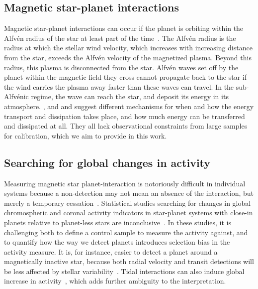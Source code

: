 \documentclass[twocolumn]{aastex631}
\begin{document}
\subsection{Magnetic star-planet interactions}
\label{sec:intro:mspi}
Magnetic star-planet interactions can occur if the planet is orbiting within the Alfv\'en radius of the star at least part of the time~\citep{preusse2006magnetic, cohen2011dynamics}. The Alfv\'en radius is the radius at which the stellar wind velocity, which increases with increasing distance from the star, exceeds the Alfv\'en velocity of the magnetized plasma. Beyond this radius, this plasma is disconnected from the star. Alfv\'en waves set off by the planet within the magnetic field they cross cannot propagate back to the star if the wind carries the plasma away faster than these waves can travel. In the sub-Alfv\'enic regime, the wave can reach the star, and deposit its energy in its atmosphere. \citet{lanza2012starplanet, lanza2018closeby}, and \citet{zarka2007plasma} and \citet{saur2013magnetic} suggest different mechanisms for when and how the energy transport and dissipation takes place, and how much energy can be transferred and dissipated at all. They all lack observational constraints from large samples for calibration, which we aim to provide in this work.

\subsection{Searching for global changes in activity}
\label{sec:intro:global}
Measuring magnetic star planet-interaction is notoriously difficult in individual systems because a non-detection may not mean an absence of the interaction, but merely a temporary cessation~\citep{shkolnik2005hot, shkolnik2008nature}. Statistical studies searching for changes in global chromospheric and coronal activity indicators in star-planet systems with close-in planets relative to planet-less stars are inconclusive~\citep{kashyap2008extrasolar,scharf2010possible, shkolnik2013ultraviolet, france2018farultraviolet, viswanath2020statistical, krejcova2012evidence, miller2015comprehensive, poppenhaeger2010coronal}. In these studies, it is challenging both to define a control sample to measure the activity against, and to quantify how the way we detect planets introduces selection bias in the activity measure. It is, for instance, easier to detect a planet around a magnetically inactive star, because both radial velocity and transit detections will be less affected by stellar variability~\citep{poppenhaeger2011correlation}. Tidal interactions can also induce global increase in activity~\citep{ilic2022tidal}, which adds further ambiguity to the interpretation. 
\end{document}
